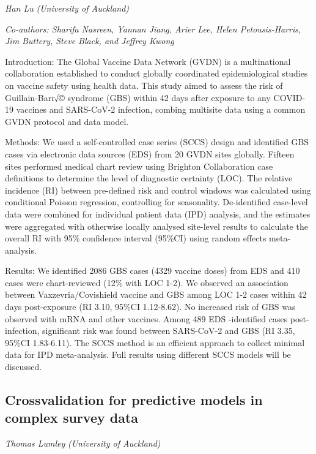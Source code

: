 \documentclass[
]{scrreprt}
\begin{document}
\emph{Han Lu} \emph{(University of Auckland)}

\emph{Co-authors: Sharifa Nasreen, Yannan Jiang, Arier Lee, Helen
Petousis-Harris, Jim Buttery, Steve Black, and Jeffrey Kwong}

\setlength{\parskip}{0.5em}

Introduction: The Global Vaccine Data Network (GVDN) is a multinational
collaboration established to conduct globally coordinated
epidemiological studies on vaccine safety using health data. This study
aimed to assess the risk of Guillain-Barr√© syndrome (GBS) within 42
days after exposure to any COVID-19 vaccines and SARS-CoV-2 infection,
combing multisite data using a common GVDN protocol and data model.

Methods: We used a self-controlled case series (SCCS) design and
identified GBS cases via electronic data sources (EDS) from 20 GVDN
sites globally. Fifteen sites performed medical chart review using
Brighton Collaboration case definitions to determine the level of
diagnostic certainty (LOC). The relative incidence (RI) between
pre-defined risk and control windows was calculated using conditional
Poisson regression, controlling for seasonality. De-identified
case-level data were combined for individual patient data (IPD)
analysis, and the estimates were aggregated with otherwise locally
analysed site-level results to calculate the overall RI with 95\%
confidence interval (95\%CI) using random effects meta-analysis.

Results: We identified 2086 GBS cases (4329 vaccine doses) from EDS and
410 cases were chart-reviewed (12\% with LOC 1-2). We observed an
association between Vaxzevria/Covishield vaccine and GBS among LOC 1-2
cases within 42 days post-exposure (RI 3.10, 95\%CI 1.12-8.62). No
increased risk of GBS was observed with mRNA and other vaccines. Among
489 EDS -identified cases post-infection, significant risk was found
between SARS-CoV-2 and GBS (RI 3.35, 95\%CI 1.83-6.11). The SCCS method
is an efficient approach to collect minimal data for IPD meta-analysis.
Full results using different SCCS models will be discussed.

\subsection{Crossvalidation for predictive models in complex survey
data}\label{crossvalidation-for-predictive-models-in-complex-survey-data}

\emph{Thomas Lumley} \emph{(University of
Auckland)}
\end{document}

